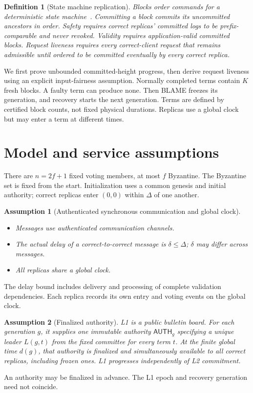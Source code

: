 \documentclass[11pt,a4paper]{article}
\newcommand{\tagg}[1]{\ensuremath{\mathsf{#1}}}
\newtheorem{definition}{Definition}[section]
\newtheorem{assumption}[assumption]{Assumption}
\begin{document}
\begin{definition}[State machine replication]
Blocks order commands for a deterministic state
machine~\cite{schneider}. Committing a
block commits its uncommitted ancestors in order. \emph{Safety} requires
correct replicas' committed logs to be prefix-comparable and never revoked.
\emph{Validity} requires application-valid committed blocks.
\emph{Request liveness} requires every correct-client request that remains
admissible until ordered to be committed eventually by every correct replica.
\end{definition}
We first prove unbounded committed-height progress, then derive request
liveness using an explicit input-fairness assumption. Normally completed
terms contain $K$ fresh blocks. A faulty term can produce none. Then BLAME freezes its generation, and recovery starts the
next generation. Terms are defined by certified block counts, not
fixed physical durations. Replicas use a global clock but may enter a term
at different times.

\section{Model and service assumptions}
\label{sec:model}
There are $n=2f+1$ fixed voting members, at most $f$
Byzantine. The Byzantine set is fixed from the start.
Initialization uses a common genesis and initial authority; correct
replicas enter $(0,0)$ within $\Delta$ of one another.

\begin{assumption}[Authenticated synchronous communication and global clock]
\label{ass:network}
\leavevmode\par
\begin{itemize}
    \item Messages use authenticated communication channels.
    \item The actual delay of a correct-to-correct message is $\delta\le\Delta$;
    $\delta$ may differ across messages.
    \item All replicas share a global clock.
\end{itemize}
\end{assumption}
The delay bound includes delivery and processing of complete validation
dependencies. Each replica records its own entry and voting events on
the global clock.

\begin{assumption}[Finalized authority]
\label{ass:authority}
L1 is a public bulletin board. For each generation $g$, it supplies one
immutable authority $\tagg{AUTH}_g$ specifying a unique leader $L(g,t)$
from the fixed committee for every term $t$. At the finite global time
$d(g)$, that authority is finalized and simultaneously available to all
correct replicas, including frozen ones. L1 progresses independently
of L2 commitment.
\end{assumption}
An authority may be finalized in advance. The L1 epoch and recovery
generation need not coincide.
\end{document}
